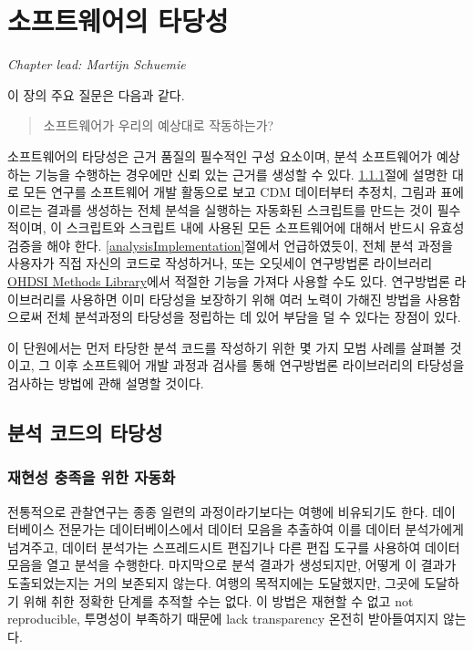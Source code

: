 \documentclass[10.5pt]{book}
\theoremstyle{definition}
\theoremstyle{definition}
\theoremstyle{definition}
\theoremstyle{remark}
\begin{document}
\chapter{소프트웨어의 타당성}\label{SoftwareValidity}

\emph{Chapter lead: Martijn Schuemie}

이 장의 주요 질문은 다음과 같다.

\begin{quote}
소프트웨어가 우리의 예상대로 작동하는가?
\end{quote}

소프트웨어의 타당성은 근거 품질의 필수적인 구성 요소이며, 분석
소프트웨어가 예상하는 기능을 수행하는 경우에만 신뢰 있는 근거를 생성할
수 있다. \ref{automation}절에 설명한 대로 모든 연구를 소프트웨어 개발
활동으로 보고 CDM 데이터부터 추정치, 그림과 표에 이르는 결과를 생성하는
전체 분석을 실행하는 자동화된 스크립트를 만드는 것이 필수적이며, 이
스크립트와 스크립트 내에 사용된 모든 소프트웨어에 대해서 반드시 유효성
검증을 해야 한다. \ref{analysisImplementation}절에서 언급하였듯이, 전체
분석 과정을 사용자가 직접 자신의 코드로 작성하거나, 또는 오딧세이
연구방법론 라이브러리
\href{https://ohdsi.github.io/MethodsLibrary/}{OHDSI Methods
Library}에서 적절한 기능을 가져다 사용할 수도 있다. 연구방법론
라이브러리를 사용하면 이미 타당성을 보장하기 위해 여러 노력이 가해진
방법을 사용함으로써 전체 분석과정의 타당성을 정립하는 데 있어 부담을 덜
수 있다는 장점이 있다. 

이 단원에서는 먼저 타당한 분석 코드를 작성하기 위한 몇 가지 모범 사례를
살펴볼 것이고, 그 이후 소프트웨어 개발 과정과 검사를 통해 연구방법론
라이브러리의 타당성을 검사하는 방법에 관해 설명할 것이다.

\section{분석 코드의 타당성}\label{--}

\subsection{재현성 충족을 위한 자동화}\label{automation}

전통적으로 관찰연구는 종종 일련의 과정이라기보다는 여행에 비유되기도
한다. 데이터베이스 전문가는 데이터베이스에서 데이터 모음을 추출하여 이를
데이터 분석가에게 넘겨주고, 데이터 분석가는 스프레드시트 편집기나 다른
편집 도구를 사용하여 데이터 모음을 열고 분석을 수행한다. 마지막으로 분석
결과가 생성되지만, 어떻게 이 결과가 도출되었는지는 거의 보존되지 않는다.
여행의 목적지에는 도달했지만, 그곳에 도달하기 위해 취한 정확한 단계를
추적할 수는 없다. 이 방법은 재현할 수 없고 not reproducible, 투명성이
부족하기 때문에 lack transparency 온전히 받아들여지지 않는다.
\end{document}
